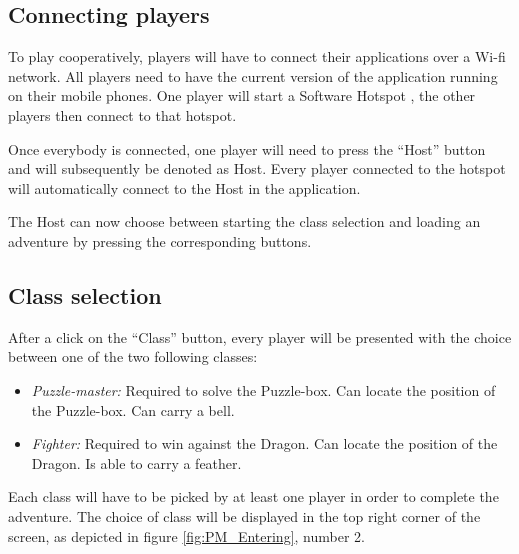 \documentclass{sigchi-ext}
\begin{document}
\subsection{Connecting players}
To play cooperatively, players will have to connect their applications over a Wi-fi network. All players need to have the current version of the application running on their mobile phones. One player will start a Software Hotspot \cite{desc:hotspot}, the other players then connect to that hotspot.

Once everybody is connected, one player will need to press the ``Host'' button and will subsequently be denoted as Host. Every player connected to the hotspot will automatically connect to the Host in the application. 

The Host can now choose between starting the class selection and loading an adventure by pressing the corresponding buttons.



\subsection{Class selection}

After a click on the ``Class'' button, every player will be presented with the choice between one of the two following classes:
\begin{itemize}\compresslist%
	\item \textit{Puzzle-master:} Required to solve the Puzzle-box. Can locate the position of the Puzzle-box. Can carry a bell.
	\item \textit{Fighter:} Required to win against the Dragon. Can locate the position of the Dragon. Is able to carry a feather.
\end{itemize}

Each class will have to be picked by at least one player in order to complete the adventure. The choice of class will be displayed in the top right corner of the screen, as depicted in figure \ref{fig:PM_Entering}, number 2.
\end{document}
